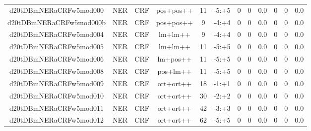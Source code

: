 \documentclass[a4paper]{article}
\begin{document}
\begin{landscape}
\begin{center}
\begin{tabular}{ |c|c|c|c|c|c|c|c|c|c|c|c|}
 
 	
 	\small{ d20tDBmNERaCRFw5mod000 } & \small{ NER} & \small{  CRF }  & pos+pos++  &  11 &  \small{  -5:+5 }  &  0 & 0 & 0.0  &  0 & 0 & 0.0 \\
 	

 
 	
 	\small{ d20tDBmNERaCRFw5mod000b } & \small{ NER} & \small{  CRF }  & pos+pos++  &  9 &  \small{  -4:+4 }  &  0 & 0 & 0.0  &  0 & 0 & 0.0 \\
 	

 
 	
 	\small{ d20tDBmNERaCRFw5mod004 } & \small{ NER} & \small{  CRF }  & lm+lm++  &  9 &  \small{  -4:+4 }  &  0 & 0 & 0.0  &  0 & 0 & 0.0 \\
 	

 
 	
 	\small{ d20tDBmNERaCRFw5mod005 } & \small{ NER} & \small{  CRF }  & lm+lm++  &  11 &  \small{  -5:+5 }  &  0 & 0 & 0.0  &  0 & 0 & 0.0 \\
 	

 
 	
 	\small{ d20tDBmNERaCRFw5mod006 } & \small{ NER} & \small{  CRF }  & lm+pos++  &  11 &  \small{  -5:+5 }  &  0 & 0 & 0.0  &  0 & 0 & 0.0 \\
 	

 
 	
 	\small{ d20tDBmNERaCRFw5mod008 } & \small{ NER} & \small{  CRF }  & pos+lm++  &  11 &  \small{  -5:+5 }  &  0 & 0 & 0.0  &  0 & 0 & 0.0 \\
 	

 
 	
 	\small{ d20tDBmNERaCRFw5mod009 } & \small{ NER} & \small{  CRF }  & ort+ort++  &  18 &  \small{  -1:+1 }  &  0 & 0 & 0.0  &  0 & 0 & 0.0 \\
 	

 
 	
 	\small{ d20tDBmNERaCRFw5mod010 } & \small{ NER} & \small{  CRF }  & ort+ort++  &  30 &  \small{  -2:+2 }  &  0 & 0 & 0.0  &  0 & 0 & 0.0 \\
 	

 
 	
 	\small{ d20tDBmNERaCRFw5mod011 } & \small{ NER} & \small{  CRF }  & ort+ort++  &  42 &  \small{  -3:+3 }  &  0 & 0 & 0.0  &  0 & 0 & 0.0 \\
 	

 
 	
 	\small{ d20tDBmNERaCRFw5mod012 } & \small{ NER} & \small{  CRF }  & ort+ort++  &  62 &  \small{  -5:+5 }  &  0 & 0 & 0.0  &  0 & 0 & 0.0 \\
 	


\end{tabular}
\end{center}
\end{landscape}
\end{document}
